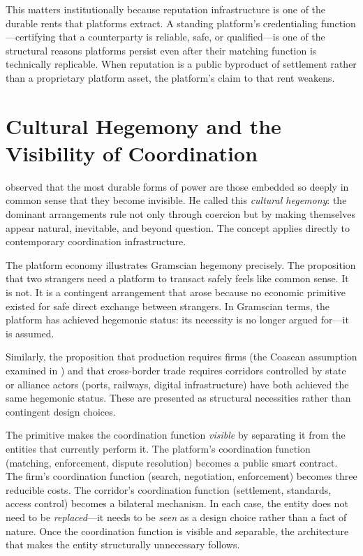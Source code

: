\documentclass[11pt,a4paper]{article}
\theoremstyle{definition}
\theoremstyle{remark}
\begin{document}
This matters institutionally because reputation infrastructure is one
of the durable rents that platforms extract. A standing platform's
credentialing function---certifying that a counterparty is reliable,
safe, or qualified---is one of the structural reasons platforms
persist even after their matching function is technically replicable.
When reputation is a public byproduct of settlement rather than a
proprietary platform asset, the platform's claim to that rent
weakens.

\section{Cultural Hegemony and the Visibility of Coordination}
\label{sec:hegemony}

\citet{gramsci1971} observed that the most durable forms of power are
those embedded so deeply in common sense that they become invisible.
He called this \emph{cultural hegemony}: the dominant arrangements
rule not only through coercion but by making themselves appear
natural, inevitable, and beyond question. The concept applies
directly to contemporary coordination infrastructure.

The platform economy illustrates Gramscian hegemony precisely. The
proposition that two strangers need a platform to transact safely
feels like common sense. It is not. It is a contingent arrangement
that arose because no economic primitive existed for safe direct
exchange between strangers. In Gramscian terms, the platform has
achieved hegemonic status: its necessity is no longer argued for---it
is assumed.

Similarly, the proposition that production requires firms (the
Coasean assumption examined in ) and that
cross-border trade requires corridors controlled by state or alliance
actors (ports, railways, digital infrastructure) have both achieved
the same hegemonic status. These are presented as structural
necessities rather than contingent design choices.

The primitive makes the coordination function \emph{visible} by
separating it from the entities that currently perform it. The
platform's coordination function (matching, enforcement, dispute
resolution) becomes a public smart contract. The firm's coordination
function (search, negotiation, enforcement) becomes three reducible
costs. The corridor's coordination function (settlement, standards,
access control) becomes a bilateral mechanism. In each case, the
entity does not need to be \emph{replaced}---it needs to be
\emph{seen} as a design choice rather than a fact of nature. Once the
coordination function is visible and separable, the architecture that
makes the entity structurally unnecessary follows.
\end{document}
